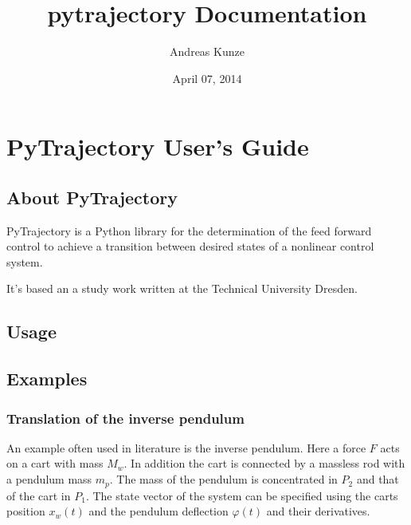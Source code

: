 \documentclass[letterpaper,10pt,english]{sphinxmanual}
\title{pytrajectory Documentation}
\date{April 07, 2014}
\author{Andreas Kunze}
\begin{document}
\maketitle
\tableofcontents
{}\label{index::doc}



\chapter{PyTrajectory User's Guide}
\label{guide/index:pytrajectory-user-s-guide}\label{guide/index:welcome-to-pytrajectory-s-documentation}\label{guide/index::doc}

\section{About PyTrajectory}
\label{guide/about:about-pytrajectory}\label{guide/about::doc}
PyTrajectory is a Python library for the determination of the feed forward control
to achieve a transition between desired states of a nonlinear control system.

It's based an a study work written at the Technical University Dresden.


\section{Usage}
\label{guide/usage:usage}\label{guide/usage::doc}

\section{Examples}
\label{guide/examples/index::doc}\label{guide/examples/index:examples}

\subsection{Translation of the inverse pendulum}
\label{guide/examples/inv_pendulum_trans:translation-of-the-inverse-pendulum}\label{guide/examples/inv_pendulum_trans::doc}
An example often used in literature is the inverse pendulum. Here a
force \(F\) acts on a cart with mass \(M_w\). In addition the
cart is connected by a massless rod with a pendulum mass \(m_p\).
The mass of the pendulum is concentrated in \(P_2\) and that of the
cart in \(P_1\). The state vector of the system can be specified
using the carts position \(x_w(t)\) and the pendulum deflection
\(\varphi(t)\) and their derivatives.
\end{document}
